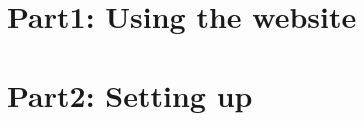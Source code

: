 \documentclass[a4paper,12pt]{article}
\begin{document}
	
	\section{Part1: Using the website }
	
		
	
	\section{Part2: Setting up}
	
	
	
	
\end{document}
